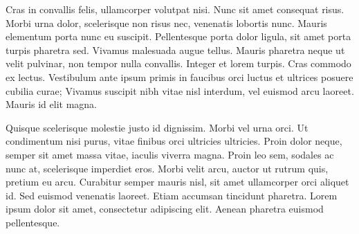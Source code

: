 Cras in convallis felis, ullamcorper volutpat nisi. Nunc sit amet consequat risus. Morbi urna dolor, scelerisque non risus nec, venenatis lobortis nunc. Mauris elementum porta nunc eu suscipit. Pellentesque porta dolor ligula, sit amet porta turpis pharetra sed. Vivamus malesuada augue tellus. Mauris pharetra neque ut velit pulvinar, non tempor nulla convallis. Integer et lorem turpis. Cras commodo ex lectus. Vestibulum ante ipsum primis in faucibus orci luctus et ultrices posuere cubilia curae; Vivamus suscipit nibh vitae nisl interdum, vel euismod arcu laoreet. Mauris id elit magna.

Quisque scelerisque molestie justo id dignissim. Morbi vel urna orci. Ut condimentum nisi purus, vitae finibus orci ultricies ultricies. Proin dolor neque, semper sit amet massa vitae, iaculis viverra magna. Proin leo sem, sodales ac nunc at, scelerisque imperdiet eros. Morbi velit arcu, auctor ut rutrum quis, pretium eu arcu. Curabitur semper mauris nisl, sit amet ullamcorper orci aliquet id. Sed euismod venenatis laoreet. Etiam accumsan tincidunt pharetra. Lorem ipsum dolor sit amet, consectetur adipiscing elit. Aenean pharetra euismod pellentesque.